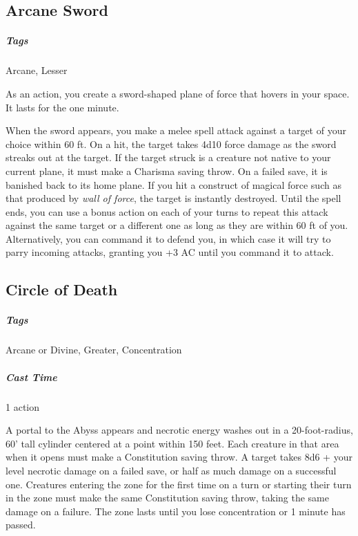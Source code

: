 \subsection{Arcane Sword}

\subparagraph*{Tags} Arcane, Lesser

As an action, you create a sword-shaped plane of force that hovers in your space. It lasts for the one minute.

When the sword appears, you make a melee spell attack against a target of your choice within 60 ft. On a hit, the target takes 4d10 force damage as the sword streaks out at the target. If the target struck is a creature not native to your current plane, it must make a Charisma saving throw. On a failed save, it is banished back to its home plane. If you hit a construct of magical force such as that produced by \textit{wall of force}, the target is instantly destroyed. Until the spell ends, you can use a bonus action on each of your turns to repeat this attack against the same target or a different one as long as they are within 60 ft of you. Alternatively, you can command it to defend you, in which case it will try to parry incoming attacks, granting you +3 AC until you command it to attack.

\subsection{Circle of Death}
\subparagraph*{Tags} Arcane or Divine, Greater, Concentration
\subparagraph*{Cast Time} 1 action

A portal to the Abyss appears and necrotic energy washes out in a 20-foot-radius, 60' tall cylinder centered at a point within 150 feet. Each creature in that area when it opens must make a Constitution saving throw. A target takes 8d6 + your level necrotic damage on a failed save, or half as much damage on a successful one. Creatures entering the zone for the first time on a turn or starting their turn in the zone must make the same Constitution saving throw, taking the same damage on a failure. The zone lasts until you lose concentration or 1 minute has passed.




